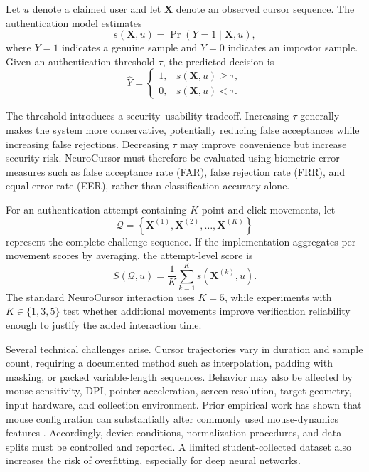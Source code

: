 \documentclass[conference]{IEEEtran}
\begin{document}
Let $u$ denote a claimed user and let $\mathbf{X}$ denote an observed cursor
sequence. The authentication model estimates
\begin{equation}
s(\mathbf{X},u)
=
\Pr(Y=1 \mid \mathbf{X},u),
\label{eq:auth_probability}
\end{equation}
where $Y=1$ indicates a genuine sample and $Y=0$ indicates an impostor
sample. Given an authentication threshold $\tau$, the predicted decision is
\begin{equation}
\widehat{Y}
=
\begin{cases}
1, & s(\mathbf{X},u) \geq \tau,\\
0, & s(\mathbf{X},u) < \tau.
\end{cases}
\label{eq:threshold_decision}
\end{equation}

The threshold introduces a security--usability tradeoff. Increasing $\tau$
generally makes the system more conservative, potentially reducing false
acceptances while increasing false rejections. Decreasing $\tau$ may improve
convenience but increase security risk. NeuroCursor must therefore be
evaluated using biometric error measures such as false acceptance rate
(FAR), false rejection rate (FRR), and equal error rate (EER), rather than
classification accuracy alone.

For an authentication attempt containing $K$ point-and-click movements, let
\begin{equation}
\mathcal{Q}
=
\left\{
\mathbf{X}^{(1)},
\mathbf{X}^{(2)},
\ldots,
\mathbf{X}^{(K)}
\right\}
\label{eq:challenge_set}
\end{equation}
represent the complete challenge sequence. If the implementation aggregates
per-movement scores by averaging, the attempt-level score is
\begin{equation}
S(\mathcal{Q},u)
=
\frac{1}{K}
\sum_{k=1}^{K}
s\!\left(\mathbf{X}^{(k)},u\right).
\label{eq:aggregate_score}
\end{equation}
The standard NeuroCursor interaction uses $K=5$, while experiments with
$K\in\{1,3,5\}$ test whether additional movements improve verification
reliability enough to justify the added interaction time.

Several technical challenges arise. Cursor trajectories vary in duration
and sample count, requiring a documented method such as interpolation,
padding with masking, or packed variable-length sequences. Behavior may also
be affected by mouse sensitivity, DPI, pointer acceleration, screen
resolution, target geometry, input hardware, and collection environment.
Prior empirical work has shown that mouse configuration can substantially
alter commonly used mouse-dynamics features \cite{kuricMouseCredibility}.
Accordingly, device conditions, normalization procedures, and data splits
must be controlled and reported. A limited student-collected dataset also
increases the risk of overfitting, especially for deep neural networks.
\end{document}
